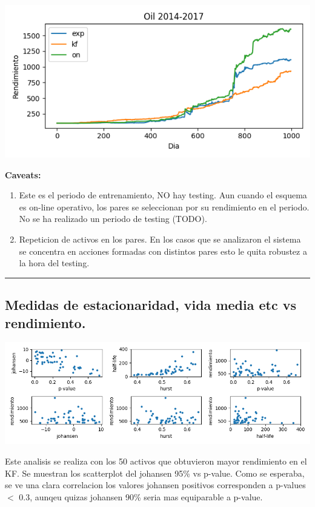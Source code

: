 \documentclass{myarticle}
\begin{document}
\begin{center}
\includegraphics[width=.9\linewidth]{./fig/compara_capital_total.png}
\end{center}

\textbf{Caveats:}

\begin{enumerate}
\item Este es el periodo de entrenamiento, NO hay testing.
Aun cuando el esquema es on-line operativo, los pares se seleccionan por su rendimiento en el periodo.
No se ha realizado un periodo de testing (TODO).

\item Repeticion de activos en los pares.
En los casos que se analizaron el sistema se concentra en acciones formadas con distintos pares esto le quita robustez a la hora del testing.
\end{enumerate}


\noindent\rule{\textwidth}{0.5pt}
\subsection{Medidas de estacionaridad, vida media etc vs rendimiento.}
\label{sec:org1eafc4d}


\begin{center}
\includegraphics[width=.9\linewidth]{./fig/best_pairs_asset_kf_1000_scatters.png}
\end{center}


Este analisis se realiza con los 50 activos que obtuvieron mayor rendimiento en el KF. Se muestran los scatterplot del johansen 95\% vs p-value. Como se esperaba, se ve una clara correlacion los valores johansen positivos corresponden a p-values \(<\) 0.3, aunqeu quizas johansen 90\% seria mas equiparable a p-value.
\end{document}
